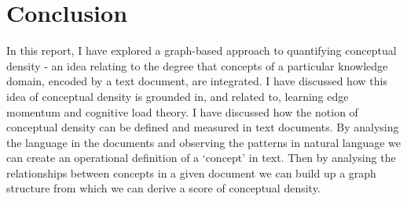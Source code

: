\documentclass[12pt]{article}
\theoremstyle{grammarstyle}
\begin{document}
\section{Conclusion} \label{sec:conclusion}
In this report, I have explored a graph-based approach to quantifying conceptual density - an idea relating to the degree that concepts of a particular knowledge domain, encoded by a text document, are integrated. I have discussed how this idea of conceptual density is grounded in, and related to, learning edge momentum and cognitive load theory. I have discussed how the notion of conceptual density can be defined and measured in text documents. By analysing the language in the documents and observing the patterns in natural language we can create an operational definition of a `concept' in text. Then by analysing the relationships between concepts in a given document we can build up a graph structure from which we can derive a score of conceptual density. 


% 





    

\end{document}
